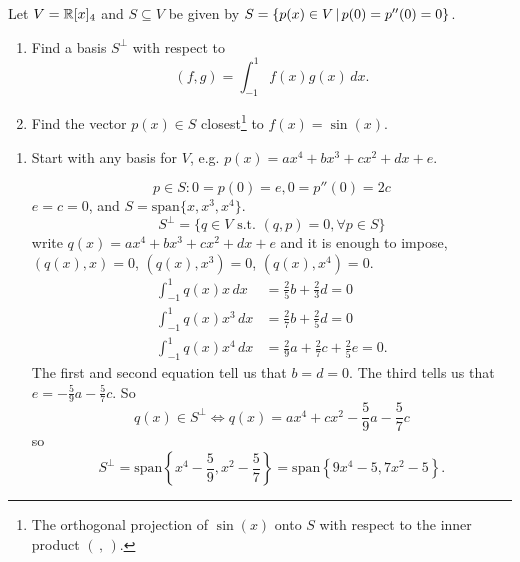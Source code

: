 \documentclass[10pt, a4paper]{article}
\begin{document}
\begin{problem}
    Let $V = \mathbb{R}[x]_4$ and $S \subseteq V$ be given by $S = \left\{p(x) \in V\,\middle|\, p(0) = p''(0) = 0\right\}$.

    \begin{enumerate}[label = (\alph*)]
        \item Find a basis $S ^ {\perp}$ with respect to
        \[
        (f, g) = \int_{-1}^{1}f(x)g(x)\,dx.
        \]

        \item Find the vector $p(x) \in S$ closest\footnote{The orthogonal projection of $\sin(x)$ onto $S$ with respect to the inner product $(\,,\,)$.} to $f(x) = \sin(x)$.
    \end{enumerate}

    \begin{solution}
        \begin{enumerate}[label = (\alph*)]
            \item Start with any basis for $V$,
            e.g. $p(x) = ax ^ 4 + bx ^ 3 + cx ^ 2 + dx + e$.

            \[
            p \in S : 0 = p(0) = e, 0 = p''(0) = 2c
            \]
            $e = c = 0$,
            and $S = \mathrm{span}\{x, x ^ 3, x ^ 4\}$.
            \[
            S ^ {\perp} = \{q \in V\text{ s.t. } (q, p) = 0, \forall p \in S\}
            \]
            write $q(x) = ax ^ 4 + bx ^ 3 + cx ^ 2 + dx + e$ and it is enough to impose,
            $(q(x), x) = 0$,
            $(q(x), x ^ 3) = 0$,
            $(q(x), x ^ 4) = 0$.
            \begin{align*}
                \int_{-1}^{1}q(x)x\,dx &= \frac{2}{5}b + \frac{2}{3}d = 0 \\
                \int_{-1}^{1}q(x)x ^ 3\,dx &= \frac{2}{7}b + \frac{2}{5}d = 0 \\
                \int_{-1}^{1}q(x)x ^ 4\,dx &= \frac{2}{9}a + \frac{2}{7}c + \frac{2}{5}e = 0.
            \end{align*}
            The first and second equation tell us that $b = d = 0$.
            The third tells us that $e = -\frac{5}{9}a - \frac{5}{7}c$.
            So
            \[
            q(x) \in S ^ {\perp} \iff q(x) = ax ^ 4 + cx ^ 2 - \frac{5}{9}a - \frac{5}{7}c
            \]
            so
            \[
            S ^ {\perp} = \mathrm{span}\left\{x ^ 4 - \frac{5}{9}, x ^ 2 - \frac{5}{7}\right\} = \mathrm{span}\left\{9x ^ 4 - 5, 7x ^ 2 - 5\right\}.
            \]


\end{enumerate}
\end{solution}
\end{problem}
\end{document}
